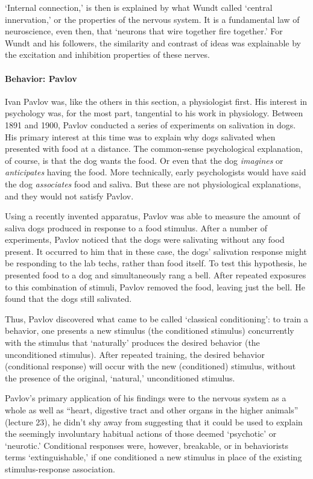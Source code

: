 `Internal connection,' is then is explained by what Wundt called `central innervation,' or the properties of the nervous system. It is a fundamental law of neuroscience, even then, that `neurons that wire together fire together.' For Wundt and his followers, the similarity and contrast of ideas was explainable by the excitation and inhibition properties of these nerves.

\paragraph{Behavior: Pavlov}
\label{behavior:pavlov}

Ivan Pavlov was, like the others in this section, a physiologist first. His interest in psychology was, for the most part, tangential to his work in physiology. Between 1891 and 1900, Pavlov conducted a series of experiments on salivation in dogs. His primary interest at this time was to explain why dogs salivated when presented with food at a distance. The common-sense psychological explanation, of course, is that the dog wants the food. Or even that the dog \emph{imagines} or \emph{anticipates} having the food. More technically, early psychologists would have said the dog \emph{associates} food and saliva. But these are not physiological explanations, and they would not satisfy Pavlov.

Using a recently invented apparatus, Pavlov was able to measure the amount of saliva dogs produced in response to a food stimulus. After a number of experiments, Pavlov noticed that the dogs were salivating without any food present. It occurred to him that in these case, the dogs' salivation response might be responding to the lab techs, rather than food itself. To test this hypothesis, he presented food to a dog and simultaneously rang a bell. After repeated exposures to this combination of stimuli, Pavlov removed the food, leaving just the bell. He found that the dogs still salivated.

Thus, Pavlov discovered what came to be called `classical conditioning': to train a behavior, one presents a new stimulus (the conditioned stimulus) concurrently with the stimulus that `naturally' produces the desired behavior (the unconditioned stimulus). After repeated training, the desired behavior (conditional response) will occur with the new (conditioned) stimulus, without the presence of the original, `natural,' unconditioned stimulus.

Pavlov's primary application of his findings were to the nervous system as a whole as well as ``heart, digestive tract and other organs in the higher animals'' (lecture 23), he didn't shy away from suggesting that it could be used to explain the seemingly involuntary habitual actions of those deemed `psychotic' or `neurotic.' Conditional responses were, however, breakable, or in behaviorists terms `extinguishable,' if one conditioned a new stimulus in place of the existing stimulus-response association.

